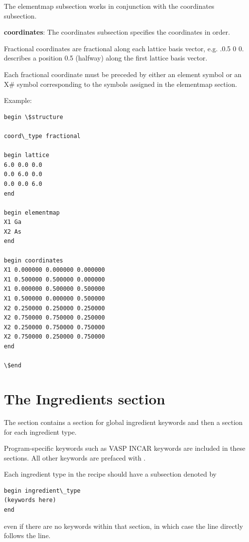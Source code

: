 \documentclass[letterpaper,10pt,english]{sphinxmanual}
\begin{document}
The elementmap subsection works in conjunction with the coordinates subsection.

\textbf{coordinates}: The coordinates subsection specifies the coordinates in order.

Fractional coordinates are fractional along each lattice basis vector, e.g. .0.5 0 0. describes a position 0.5 (halfway) along the first lattice basis vector.

Each fractional coordinate must be preceded by either an element symbol or an X\# symbol corresponding to the symbols assigned in the elementmap section.

Example:

\begin{Verbatim}[commandchars=\\\{\}]
begin \$structure

coord\_type fractional

begin lattice
6.0 0.0 0.0
0.0 6.0 0.0
0.0 0.0 6.0
end

begin elementmap
X1 Ga
X2 As
end

begin coordinates
X1 0.000000 0.000000 0.000000
X1 0.500000 0.500000 0.000000
X1 0.000000 0.500000 0.500000
X1 0.500000 0.000000 0.500000
X2 0.250000 0.250000 0.250000
X2 0.750000 0.750000 0.250000
X2 0.250000 0.750000 0.750000
X2 0.750000 0.250000 0.750000
end

\$end
\end{Verbatim}


\section{The Ingredients section}
\label{3_0_inputfile:the-ingredients-section}
The  section contains a section for global ingredient keywords and then a section for each ingredient type.

Program-specific keywords such as VASP INCAR keywords are included in these sections. All other keywords are prefaced with .

Each ingredient type in the recipe should have a subsection denoted by

\begin{Verbatim}[commandchars=\\\{\}]
begin ingredient\_type
(keywords here)
end
\end{Verbatim}

even if there are no keywords within that section, in which case the  line directly follows the  line.
\end{document}
